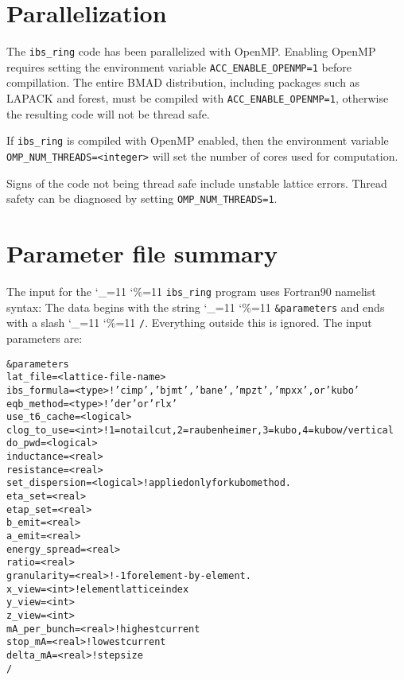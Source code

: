 \documentclass[11pt]{article}
\newcommand\ttcmd{\begingroup\catcode`\_=11 \catcode`\%=11 \dottcmd}
\newcommand\dottcmd[1]{\texttt{#1}\endgroup}
\newcommand{\vn}{\ttcmd}
\newlength{\ExBeg}
\newlength{\ExEnd}
\newenvironment{example}
  {\vspace{\ExBeg} \begin{alltt}}
  {\end{alltt} \vspace{\ExEnd}}
\begin{document}
\section{Parallelization}
The {\tt ibs_ring} code has been parallelized with OpenMP.  Enabling OpenMP
requires setting the environment variable {\tt ACC_ENABLE_OPENMP=1} before
compillation.  The entire
BMAD distribution, including packages such as LAPACK and forest, must be
compiled with {\tt ACC_ENABLE_OPENMP=1}, otherwise the resulting code
will not be thread safe.

If {\tt ibs_ring} is compiled with OpenMP enabled, then the environment
variable {\tt OMP_NUM_THREADS=<integer>} will set the number of cores used for 
computation.

Signs of the code not being thread safe include unstable lattice errors.
Thread safety can be diagnosed by setting {\tt OMP_NUM_THREADS=1}.

\section{Parameter file summary}
\label{s:run}

The input for the \vn{ibs_ring} program uses Fortran90 namelist
syntax: The data begins with the string \vn{\&parameters} and ends
with a slash \vn{/}. Everything outside this is ignored.
The input parameters are:
\begin{example}
\&parameters
  lat_file = <lattice-file-name>
  ibs_formula = <type>  ! 'cimp', 'bjmt', 'bane', 'mpzt', 'mpxx', or 'kubo'
  eqb_method = <type>   ! 'der' or 'rlx'
  use_t6_cache = <logical>
  clog_to_use = <int>   ! 1=no tail cut, 2=raubenheimer, 3=kubo, 4=kubo w/vertical
  do_pwd = <logical>
  inductance = <real>
  resistance = <real>
  set_dispersion = <logical> ! applied only for kubo method.
  eta_set = <real>
  etap_set = <real>
  b_emit = <real>
  a_emit = <real>
  energy_spread = <real>
  ratio = <real>
  granularity = <real>   ! -1 for element-by-element.
  x_view = <int>  ! element lattice index 
  y_view = <int>  
  z_view = <int>  
  mA_per_bunch = <real>  ! highest current
  stop_mA = <real>       ! lowest current
  delta_mA = <real>      ! step size
/
\end{example}
\end{document}
